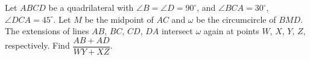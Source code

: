 Let $ABCD$ be a quadrilateral with $\angle B=\angle D=90^{\circ}$, and $\angle BCA=30^{\circ}$, $\angle DCA=45^{\circ}$. Let $M$ be the midpoint of $AC$ and $\omega$ be the circumcircle of $BMD$. The extensions of lines $AB$, $BC$, $CD$, $DA$ intersect $\omega$ again at points $W$, $X$, $Y$, $Z$, respectively. Find $\dfrac{AB+AD}{WY+XZ}$.
